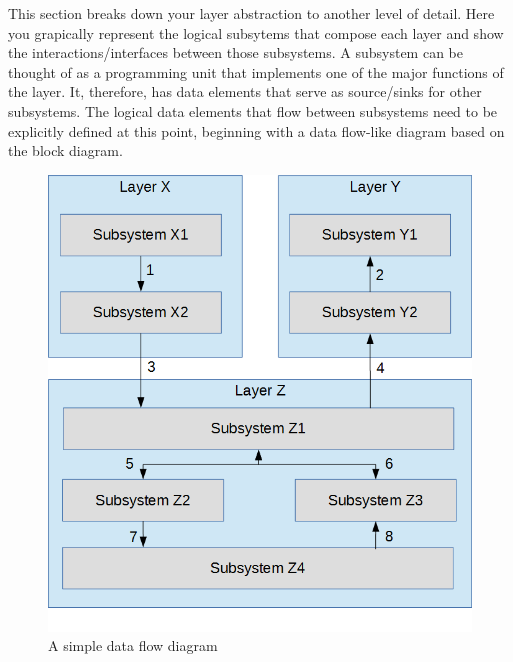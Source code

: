 This section breaks down your layer abstraction to another level of detail. Here you grapically represent the logical subsytems that compose each layer and show the interactions/interfaces between those subsystems. A subsystem can be thought of as a programming unit that implements one of the major functions of the layer. It, therefore, has data elements that serve as source/sinks for other subsystems. The logical data elements that flow between subsystems need to be explicitly defined at this point, beginning with a data flow-like diagram based on the block diagram.

\begin{figure}[h!]
	\centering
 	\includegraphics[width=\textwidth]{images/data_flow}
 \caption{A simple data flow diagram}
\end{figure}

